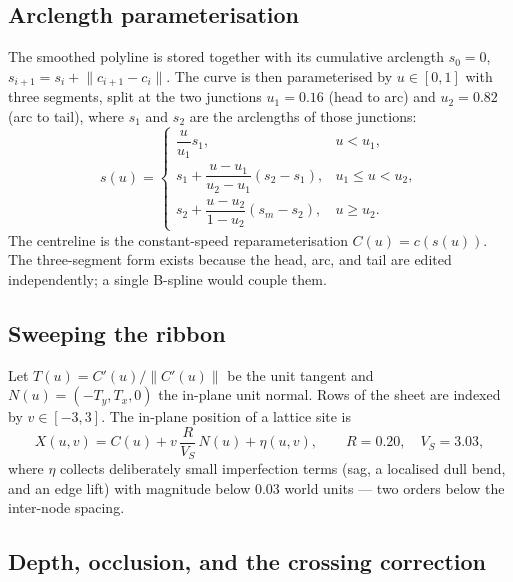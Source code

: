 \documentclass[11pt,a4paper]{article}
\theoremstyle{definition}
\begin{document}
\subsection{Arclength parameterisation}

The smoothed polyline is stored together with its cumulative arclength
$s_0=0$, $s_{i+1}=s_i+\lVert c_{i+1}-c_i\rVert$. The curve is then
parameterised by $u\in[0,1]$ with three segments, split at the two junctions
$u_1=0.16$ (head to arc) and $u_2=0.82$ (arc to tail), where $s_1$ and $s_2$
are the arclengths of those junctions:
\begin{equation}
\label{eq:arclength}
s(u)=
\begin{cases}
\dfrac{u}{u_1}s_1, & u<u_1,\\[6pt]
s_1+\dfrac{u-u_1}{u_2-u_1}(s_2-s_1), & u_1\le u<u_2,\\[6pt]
s_2+\dfrac{u-u_2}{1-u_2}(s_m-s_2), & u\ge u_2 .
\end{cases}
\end{equation}
The centreline is the constant-speed reparameterisation $C(u)=c(s(u))$. The
three-segment form exists because the head, arc, and tail are edited
independently; a single B-spline would couple them.

\subsection{Sweeping the ribbon}

Let $T(u)=C'(u)/\lVert C'(u)\rVert$ be the unit tangent and
$N(u)=(-T_y,T_x,0)$ the in-plane unit normal. Rows of the sheet are indexed by
$v\in[-3,3]$. The in-plane position of a lattice site is
\begin{equation}
\label{eq:inplane}
X(u,v)=C(u)+v\,\frac{R}{V_S}\,N(u)+\eta(u,v),
\qquad R=0.20,\quad V_S=3.03,
\end{equation}
where $\eta$ collects deliberately small imperfection terms (sag, a localised
dull bend, and an edge lift) with magnitude below $0.03$ world units --- two
orders below the inter-node spacing.

\subsection{Depth, occlusion, and the crossing correction}
\label{sec:depth}
\end{document}
